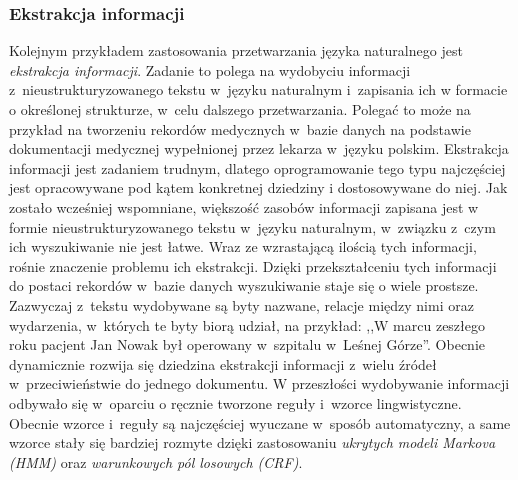\documentclass[a4paper, twoside, openright, 12pt]{report}
\begin{document}
            \subsubsection{Ekstrakcja informacji}
                Kolejnym przykładem zastosowania przetwarzania języka naturalnego jest \emph{ekstrakcja informacji}. Zadanie
                to polega na wydobyciu informacji z~nieustrukturyzowanego tekstu w~języku naturalnym i~zapisania ich w
                formacie o określonej strukturze, w~celu dalszego
                przetwarzania. Polegać to może na przykład na tworzeniu rekordów medycznych w~bazie danych na podstawie
                dokumentacji medycznej wypełnionej przez lekarza w~języku polskim. Ekstrakcja informacji jest zadaniem
                trudnym, dlatego oprogramowanie tego typu najczęściej jest opracowywane pod kątem konkretnej dziedziny i
                dostosowywane do niej. Jak zostało wcześniej wspomniane, większość zasobów informacji zapisana jest w
                formie nieustrukturyzowanego tekstu w~języku naturalnym, w~związku z~czym ich wyszukiwanie nie jest łatwe.
                Wraz ze wzrastającą ilością tych informacji, rośnie znaczenie problemu ich ekstrakcji. Dzięki
                przekształceniu tych informacji do postaci rekordów w~bazie danych wyszukiwanie staje się o wiele prostsze.
                Zazwyczaj z~tekstu wydobywane są byty nazwane, relacje między nimi oraz wydarzenia, w~których te byty
                biorą udział, na przykład: ,,W marcu zeszłego roku pacjent Jan Nowak był operowany w~szpitalu w~Leśnej
                Górze''. Obecnie dynamicznie rozwija się dziedzina ekstrakcji informacji z~wielu źródeł w~przeciwieństwie
                do jednego dokumentu. W przeszłości wydobywanie informacji odbywało się w~oparciu o ręcznie tworzone
                reguły i~wzorce lingwistyczne. Obecnie wzorce i~reguły są najczęściej wyuczane w~sposób automatyczny,
                a same wzorce stały się bardziej rozmyte dzięki zastosowaniu \emph{ukrytych modeli Markova (HMM)} oraz
                \emph{warunkowych pól losowych (CRF)}\cite{INFORMATIONEXTRACTION}.
\end{document}

